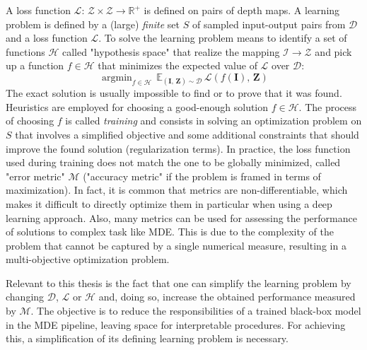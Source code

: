A loss function $\mathcal{L}: \, \mathcal{Z} \times \mathcal{Z} \rightarrow \mathbb{R}^{+}$ is defined on pairs of depth maps.
A learning problem is defined by a (large) \textit{finite} set $S$ of sampled input-output pairs from $\mathcal{D}$ and a loss function $\mathcal{L}$.
To solve the learning problem means to identify a set of functions $\mathcal{H}$ called "hypothesis space" \cite{ML_book} that realize the mapping $\mathcal{I} \rightarrow \mathcal{Z}$ and pick up a function $f \in \mathcal{H}$ that minimizes the expected value of $\mathcal{L}$ over $\mathcal{D}$:
\[
    \mathop{\text{argmin}}_{f \in \mathcal{H}} \, \mathbb{E}_{(\mathbf{I}, \, \mathbf{Z}) \sim \mathcal{D}} \, \mathcal{L}(f(\mathbf{I}), \, \mathbf{Z})
\]
The exact solution is usually impossible to find or to prove that it was found.
Heuristics are employed for choosing a good-enough solution $f \in \mathcal{H}$.
The process of choosing $f$ is called \textit{training} and consists in solving an optimization problem on $S$ that involves a simplified objective and some additional constraints that should improve the found solution (regularization terms).
In practice, the loss function used during training does not match the one to be globally minimized, called "error metric" $\mathcal{M}$ ("accuracy metric" if the problem is framed in terms of maximization).
In fact, it is common that metrics are non-differentiable, which makes it difficult to directly optimize them in particular when using a deep learning approach. 
Also, many metrics can be used for assessing the performance of solutions to complex task like MDE.
This is due to the complexity of the problem that cannot be captured by a single numerical measure, resulting in a multi-objective optimization problem.

Relevant to this thesis is the fact that one can simplify the learning problem by changing $\mathcal{D}$, $\mathcal{L}$ or $\mathcal{H}$ and, doing so, increase the obtained performance measured by $\mathcal{M}$. 
The objective is to reduce the responsibilities of a trained black-box model in the MDE pipeline, leaving space for interpretable procedures.
For achieving this, a simplification of its defining learning problem is necessary.

\vspace{0.5cm}

